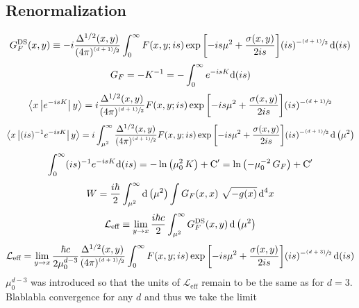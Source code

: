 \subsection{Renormalization}
\begin{equation}
	G_F^{\text{DS}}(x,y)\equiv -i\frac{\Delta^{1/2}(x,y)}{(4\pi)^{\sfrac{(d+1)}{2}}}\int^\infty_0F(x,y;is)\exp{\left[-is\mu^2+\frac{\sigma(x,y)}{2is}\right]}(is)^{-\sfrac{(d+1)}{2}}\,\text{d} (is)
\end{equation}
\begin{equation}
	G_F=-K^{-1}=-\int_0^\infty e^{-is K}\text{d} (is)
\end{equation}
\begin{equation}
\left\langle x\left|e^{-isK}\right|y\right\rangle=i\frac{\Delta^{1/2}(x,y)}{(4\pi)^{\sfrac{(d+1)}{2}}}F(x,y;is)\exp{\left[-is\mu^2+\frac{\sigma(x,y)}{2is}\right]}(is)^{-\sfrac{(d+1)}{2}}
\end{equation}
\begin{equation}
	\left\langle x\left|(is)^{-1}e^{-isK}\right|y\right\rangle=i\int_{\mu^2}^\infty\frac{\Delta^{1/2}(x,y)}{(4\pi)^{\sfrac{(d+1)}{2}}}F(x,y;is)\exp{\left[-is\mu^2+\frac{\sigma(x,y)}{2is}\right]}(is)^{-\sfrac{(d+1)}{2}}\,\text{d} \left(\mu^2\right)
\end{equation}
\begin{equation}
	\int_0^\infty(is)^{-1}e^{-is K}\text{d}(is)=-\ln\left(\mu_0^2\,K\right)+\text{C}'=\ln\left(-\mu^{-2}_0\,G_F\right)+\text{C}'
\end{equation}
\begin{equation}
	W=\frac{i\hbar}{2}  \int_{\mu^2}^\infty \text{d} \left(\mu^2\right)\int G_F(x,x)\,\,\sqrt{-g(x)}\,\text{d}^4x
\end{equation}
\begin{equation}
	\mathcal{L}_{\text{eff}}\equiv \lim\limits_{y\to x}\frac{i\hbar c}{2}\int_{\mu^2}^\infty G_F^{\text{DS}}(x,y)\,\text{d}\left(\mu^2\right)
\end{equation}
\begin{equation}
	\mathcal{L}_{\text{eff}}=\lim\limits_{y\to x}\frac{\hbar c}{2\mu_0^{d-3}}\frac{\Delta^{1/2}(x,y)}{(4\pi)^{\sfrac{(d+1)}{2}}}\int^\infty_0F(x,y;is)\exp{\left[-is\mu^2+\frac{\sigma(x,y)}{2is}\right]}(is)^{-\sfrac{(d+3)}{2}}\,\text{d} (is)
\end{equation}
$\mu_0^{d-3}$ was introduced so that the units of $\mathcal{L}_{\text{eff}}$ remain to be the same as for $d=3$. Blablabla convergence for any $d$ and thus we take the limit

